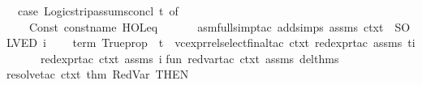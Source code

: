 \begin{isabellebody}
\ \ case\ {\isacharparenleft}{\kern0pt}Logic{\isachardot}{\kern0pt}strip{\isacharunderscore}{\kern0pt}assums{\isacharunderscore}{\kern0pt}concl\ t{\isacharparenright}{\kern0pt}\ of\isanewline
\ \ \ \ Const\ {\isacharparenleft}{\kern0pt}{\isacharat}{\kern0pt}{\isacharbraceleft}{\kern0pt}const{\isacharunderscore}{\kern0pt}name\ {\isachardoublequote}{\kern0pt}HOL{\isachardot}{\kern0pt}eq{\isachardoublequote}{\kern0pt}{\isacharbraceright}{\kern0pt}{\isacharcomma}{\kern0pt}{\isacharunderscore}{\kern0pt}{\isacharparenright}{\kern0pt}\ {\isachardollar}{\kern0pt}\ {\isacharunderscore}{\kern0pt}\ {\isachardollar}{\kern0pt}\ {\isacharunderscore}{\kern0pt}\ {\isacharequal}{\kern0pt}{\isachargreater}{\kern0pt}\ {\isacharparenleft}{\kern0pt}{\isacharparenleft}{\kern0pt}{\isacharparenleft}{\kern0pt}\ asm{\isacharunderscore}{\kern0pt}full{\isacharunderscore}{\kern0pt}simp{\isacharunderscore}{\kern0pt}tac\ {\isacharparenleft}{\kern0pt}add{\isacharunderscore}{\kern0pt}simps\ assms\ ctxt{\isacharparenright}{\kern0pt}\ {\isacharbar}{\kern0pt}{\isachargreater}{\kern0pt}\ SOLVED{\isacharprime}{\kern0pt}{\isacharparenright}{\kern0pt}\ i{\isacharparenright}{\kern0pt}{\isacharparenright}{\kern0pt}\isanewline
\ \ \ {\isacharbar}{\kern0pt}\ {\isacharat}{\kern0pt}{\isacharbraceleft}{\kern0pt}term\ {\isachardoublequote}{\kern0pt}Trueprop{\isachardoublequote}{\kern0pt}{\isacharbraceright}{\kern0pt}\ {\isachardollar}{\kern0pt}\ t{\isacharprime}{\kern0pt}\ {\isacharequal}{\kern0pt}{\isachargreater}{\kern0pt}\ vc{\isacharunderscore}{\kern0pt}expr{\isacharunderscore}{\kern0pt}rel{\isacharunderscore}{\kern0pt}select{\isacharunderscore}{\kern0pt}final{\isacharunderscore}{\kern0pt}tac\ ctxt\ red{\isacharunderscore}{\kern0pt}expr{\isacharunderscore}{\kern0pt}tac\ assms\ {\isacharparenleft}{\kern0pt}t{\isacharprime}{\kern0pt}{\isacharcomma}{\kern0pt}i{\isacharparenright}{\kern0pt}\isanewline
\ \ \ {\isacharbar}{\kern0pt}\ {\isacharunderscore}{\kern0pt}\ {\isacharequal}{\kern0pt}{\isachargreater}{\kern0pt}\ red{\isacharunderscore}{\kern0pt}expr{\isacharunderscore}{\kern0pt}tac\ ctxt\ assms\ i\isanewline
\isanewline
fun\ red{\isacharunderscore}{\kern0pt}var{\isacharunderscore}{\kern0pt}tac\ ctxt\ assms\ del{\isacharunderscore}{\kern0pt}thms\ \ {\isacharequal}{\kern0pt}\isanewline
resolve{\isacharunderscore}{\kern0pt}tac\ ctxt\ {\isacharbrackleft}{\kern0pt}{\isacharat}{\kern0pt}{\isacharbraceleft}{\kern0pt}thm\ RedVar{\isacharbraceright}{\kern0pt}{\isacharbrackright}{\kern0pt}\ THEN{\isacharprime}{\kern0pt}\ \isanewline

\end{isabellebody}
